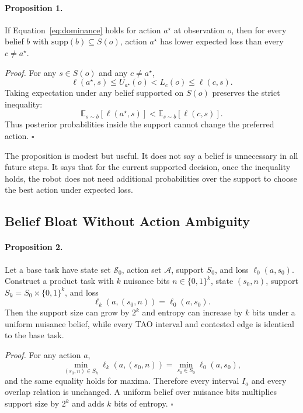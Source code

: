 \documentclass{article}
\newcommand{\states}{\mathcal{S}}
\newcommand{\actions}{\mathcal{A}}
\newcommand{\loss}{\ell}
\newcommand{\supp}{\mathrm{supp}}
\begin{document}
\paragraph{Proposition 1.}
If Equation~\ref{eq:dominance} holds for action $a^\star$ at observation $o$, then for every belief $b$ with $\supp(b)\subseteq S(o)$, action $a^\star$ has lower expected loss than every $c\neq a^\star$.

\emph{Proof.}
For any $s\in S(o)$ and any $c\neq a^\star$,
\begin{equation}
  \loss(a^\star,s) \leq U_{a^\star}(o)
  < L_c(o) \leq \loss(c,s).
\end{equation}
Taking expectation under any belief supported on $S(o)$ preserves the strict inequality:
\begin{equation}
  \mathbb{E}_{s\sim b}[\loss(a^\star,s)]
  < \mathbb{E}_{s\sim b}[\loss(c,s)].
\end{equation}
Thus posterior probabilities inside the support cannot change the preferred action. \hfill $\square$

The proposition is modest but useful. It does not say a belief is unnecessary in all future steps. It says that for the current supported decision, once the inequality holds, the robot does not need additional probabilities over the support to choose the best action under expected loss.

\subsection{Belief Bloat Without Action Ambiguity}

\paragraph{Proposition 2.}
Let a base task have state set $\states_0$, action set $\actions$, support $S_0$, and loss $\loss_0(a,s_0)$. Construct a product task with $k$ nuisance bits $n\in\{0,1\}^k$, state $(s_0,n)$, support $S_k=S_0\times\{0,1\}^k$, and loss
\begin{equation}
  \loss_k(a,(s_0,n))=\loss_0(a,s_0).
\end{equation}
Then the support size can grow by $2^k$ and entropy can increase by $k$ bits under a uniform nuisance belief, while every TAO interval and contested edge is identical to the base task.

\emph{Proof.}
For any action $a$,
\begin{equation}
  \min_{(s_0,n)\in S_k}\loss_k(a,(s_0,n))
  =
  \min_{s_0\in S_0}\loss_0(a,s_0),
\end{equation}
and the same equality holds for maxima. Therefore every interval $I_a$ and every overlap relation is unchanged. A uniform belief over nuisance bits multiplies support size by $2^k$ and adds $k$ bits of entropy. \hfill $\square$
\end{document}
